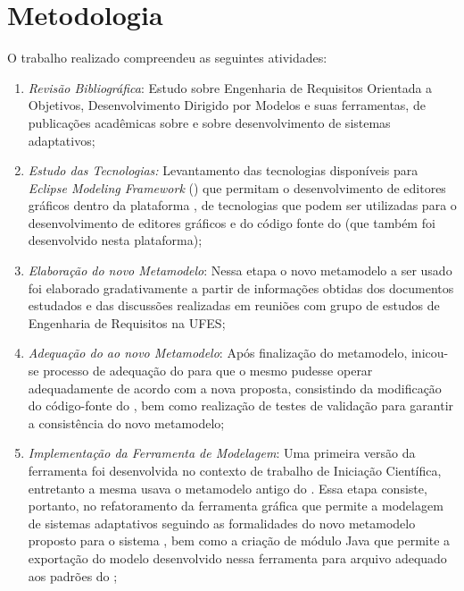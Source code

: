 \section{Metodologia}
\label{sec-intro-metodologia}

O trabalho realizado compreendeu as seguintes atividades:


\begin{enumerate}
	
	\item \textit{Revisão Bibliográfica}: Estudo sobre Engenharia de Requisitos Orientada a Objetivos, Desenvolvimento Dirigido por Modelos e suas ferramentas, de publicações acadêmicas sobre \zanshin e sobre desenvolvimento de sistemas adaptativos;
	
	\item \textit{Estudo das Tecnologias:} Levantamento das tecnologias disponíveis para \textit{Eclipse Modeling Framework} (\emf) que permitam o desenvolvimento de editores gráficos dentro da plataforma \eclipse, de tecnologias que podem ser utilizadas para o desenvolvimento de editores gráficos e do código fonte do \zanshin (que também foi desenvolvido nesta plataforma);
	
	\item \textit{Elaboração do novo Metamodelo}: Nessa etapa o novo metamodelo a ser usado foi elaborado gradativamente a partir de informações obtidas dos documentos estudados e das discussões realizadas em reuniões com grupo de estudos de Engenharia de Requisitos na UFES;
	
	\item \textit{Adequação do \zanshin ao novo Metamodelo}: Após finalização do metamodelo, inicou-se processo de adequação do \framework para que o mesmo pudesse operar adequadamente de acordo com a nova proposta, consistindo da modificação do código-fonte do \zanshin, bem como realização de testes de validação para garantir a consistência do novo metamodelo;
	
	\item \textit{Implementação da Ferramenta de Modelagem}: Uma primeira versão da ferramenta foi desenvolvida no contexto de trabalho de Iniciação Científica, entretanto a mesma usava o metamodelo antigo do \zanshin. Essa etapa consiste, portanto, no refatoramento da ferramenta gráfica que permite a modelagem de sistemas adaptativos seguindo as formalidades do novo metamodelo proposto para o sistema \zanshin, bem como a criação de módulo Java que permite a exportação do modelo desenvolvido nessa ferramenta para arquivo \xml adequado aos padrões do \framework;
	

\end{enumerate}
